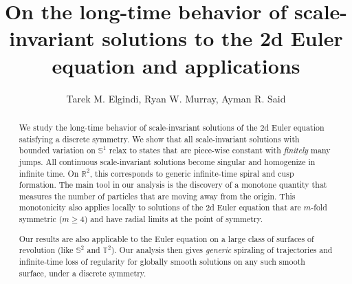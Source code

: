 \documentclass[10pt]{article}
\title{On the long-time behavior of scale-invariant solutions to the 2d Euler equation and applications}
\author{Tarek M. Elgindi, Ryan W. Murray, Ayman R. Said}
\numberwithin{equation}{section}
\theoremstyle{plain}
\theoremstyle{definition}
\numberwithin{equation}{section}
\begin{document}
\maketitle


\begin{abstract}
    We study the long-time behavior of scale-invariant solutions of the 2d Euler equation satisfying a discrete symmetry. We show that all scale-invariant solutions with bounded variation on $\mathbb{S}^1$ relax to states that are piece-wise constant with \emph{finitely} many jumps.
     All continuous scale-invariant solutions become singular and homogenize in infinite time. On $\mathbb{R}^2$, this corresponds to generic infinite-time spiral and cusp formation.  The main tool in our analysis is the discovery of a monotone quantity that measures the number of particles that are moving away from the origin.
    This monotonicity also applies locally to solutions of the 2d Euler equation that are $m$-fold symmetric ($m\geq 4$) and have radial limits at the point of symmetry. 
     
     Our results are also applicable to the Euler equation on a large class  of surfaces of revolution (like $\mathbb{S}^2$ and $\mathbb{T}^2$). Our analysis then gives \emph{generic} spiraling of trajectories and infinite-time loss of regularity for globally smooth solutions on any such smooth surface, under a discrete symmetry.
\end{abstract}
\end{document}

